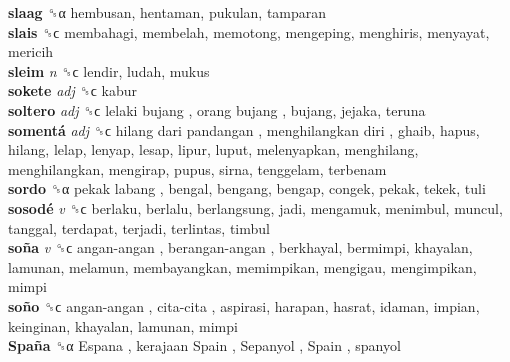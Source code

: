 \textbf{slaag} ␝α  hembusan, hentaman, pukulan, tamparan  \\
\textbf{slais} ␝ϲ  membahagi, membelah, memotong, mengeping, menghiris, menyayat, mericih  \\
\textbf{sleim} \emph{n}  ␝ϲ  lendir, ludah, mukus  \\
\textbf{sokete} \emph{adj}  ␝ϲ  kabur  \\
\textbf{soltero} \emph{adj}  ␝ϲ   lelaki bujang ,  orang bujang , bujang, jejaka, teruna  \\
\textbf{somentá} \emph{adj}  ␝ϲ   hilang dari pandangan ,  menghilangkan diri , ghaib, hapus, hilang, lelap, lenyap, lesap, lipur, luput, melenyapkan, menghilang, menghilangkan, mengirap, pupus, sirna, tenggelam, terbenam  \\
\textbf{sordo} ␝α   pekak labang , bengal, bengang, bengap, congek, pekak, tekek, tuli  \\
\textbf{sosodé} \emph{v}  ␝ϲ  berlaku, berlalu, berlangsung, jadi, mengamuk, menimbul, muncul, tanggal, terdapat, terjadi, terlintas, timbul  \\
\textbf{soña} \emph{v}  ␝ϲ   angan-angan ,  berangan-angan , berkhayal, bermimpi, khayalan, lamunan, melamun, membayangkan, memimpikan, mengigau, mengimpikan, mimpi  \\
\textbf{soño} ␝ϲ   angan-angan ,  cita-cita , aspirasi, harapan, hasrat, idaman, impian, keinginan, khayalan, lamunan, mimpi  \\
\textbf{Spaña} ␝α   Espana ,  kerajaan Spain ,  Sepanyol ,  Spain , spanyol  \\
